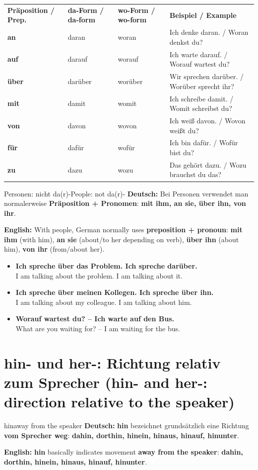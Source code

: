 \documentclass[a4paper,11pt]{article}
\newcommand{\GermanText}[1]{\textbf{Deutsch: }#1\par}
\newcommand{\EnglishText}[1]{{\small\color{SoftGray}\textbf{English: }#1\par}}
\newcommand{\ExampleItem}[2]{\item \textbf{#1}\\{\small\color{SoftGray}#2}}
\newcommand{\BSection}[2]{\section{#1 \textnormal{\small (#2)}}}
\begin{document}
\begin{longtable}{>{\bfseries}p{2.7cm}|p{3.5cm}|p{3.5cm}|p{4.7cm}}
\rowcolor{HeaderBlueDark}
\color{white}\textbf{Präposition / Prep.} & \color{white}\textbf{da-Form / da-form} & \color{white}\textbf{wo-Form / wo-form} & \color{white}\textbf{Beispiel / Example} \\
an & daran & woran & Ich denke daran. / Woran denkst du? \\
auf & darauf & worauf & Ich warte darauf. / Worauf wartest du? \\
über & darüber & worüber & Wir sprechen darüber. / Worüber sprecht ihr? \\
mit & damit & womit & Ich schreibe damit. / Womit schreibst du? \\
von & davon & wovon & Ich weiß davon. / Wovon weißt du? \\
für & dafür & wofür & Ich bin dafür. / Wofür bist du? \\
zu & dazu & wozu & Das gehört dazu. / Wozu brauchst du das? \\
\end{longtable}

\begin{grammarentry}{Personen: nicht da(r)-}{People: not da(r)-}
\GermanText{Bei Personen verwendet man normalerweise \textbf{Präposition + Pronomen}: \textbf{mit ihm, an sie, über ihn, von ihr}.}
\EnglishText{With people, German normally uses \textbf{preposition + pronoun}: \textbf{mit ihm} (with him), \textbf{an sie} (about/to her depending on verb), \textbf{über ihn} (about him), \textbf{von ihr} (from/about her).}
\end{grammarentry}

\begin{exbox}
\begin{itemize}
\ExampleItem{Ich spreche über das Problem. Ich spreche darüber.}{I am talking about the problem. I am talking about it.}
\ExampleItem{Ich spreche über meinen Kollegen. Ich spreche über ihn.}{I am talking about my colleague. I am talking about him.}
\ExampleItem{Worauf wartest du? -- Ich warte auf den Bus.}{What are you waiting for? -- I am waiting for the bus.}
\end{itemize}
\end{exbox}

\BSection{hin- und her-: Richtung relativ zum Sprecher}{hin- and her-: direction relative to the speaker}

\begin{grammarentry}{hin}{away from the speaker}
\GermanText{\textbf{hin} bezeichnet grundsätzlich eine Richtung \textbf{vom Sprecher weg}: \textbf{dahin, dorthin, hinein, hinaus, hinauf, hinunter}.}
\EnglishText{\textbf{hin} basically indicates movement \textbf{away from the speaker}: \textbf{dahin, dorthin, hinein, hinaus, hinauf, hinunter}.}
\end{grammarentry}
\end{document}
